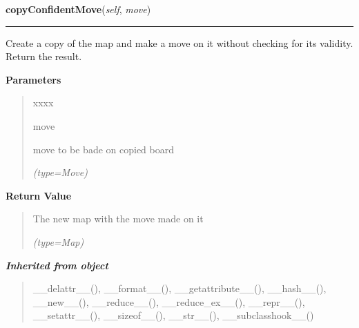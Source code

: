     \vspace{0.5ex}

\hspace{.8\funcindent}\begin{boxedminipage}{\funcwidth}

    \raggedright \textbf{copyConfidentMove}(\textit{self}, \textit{move})

    \vspace{-1.5ex}

    \rule{\textwidth}{0.5\fboxrule}
\setlength{\parskip}{2ex}
    Create a copy of the map and make a move on it without checking for its
    validity. Return the result.

\setlength{\parskip}{1ex}
      \textbf{Parameters}
      \vspace{-1ex}

      \begin{quote}
        \begin{Ventry}{xxxx}

          \item[move]

          move to be bade on copied board

            {\it (type=Move)}

        \end{Ventry}

      \end{quote}

      \textbf{Return Value}
    \vspace{-1ex}

      \begin{quote}
      The new map with the move made on it

      {\it (type=Map)}

      \end{quote}

    \end{boxedminipage}


\large{\textbf{\textit{Inherited from object}}}

\begin{quote}
\_\_delattr\_\_(), \_\_format\_\_(), \_\_getattribute\_\_(), \_\_hash\_\_(), \_\_new\_\_(), \_\_reduce\_\_(), \_\_reduce\_ex\_\_(), \_\_repr\_\_(), \_\_setattr\_\_(), \_\_sizeof\_\_(), \_\_str\_\_(), \_\_subclasshook\_\_()
\end{quote}


